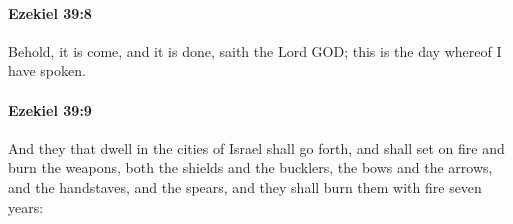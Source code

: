 		\paragraph{Ezekiel 39:8} %
			\label{EZEKIEL-39-8}

			Behold, it is come, and it is done, saith the Lord GOD; this is the day whereof I have spoken.


		\paragraph{Ezekiel 39:9} %
			\label{EZEKIEL-39-9}

			And they that dwell in the cities of Israel shall go forth, and shall set on fire and burn the weapons, both the shields and the bucklers, the bows and the arrows, and the handstaves, and the spears, and they shall burn them with fire seven years:


